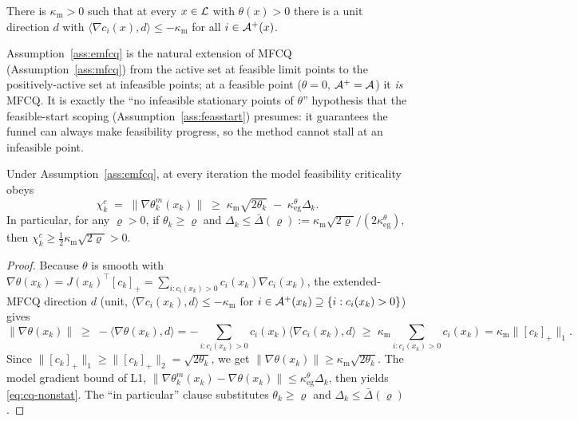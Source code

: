 \begin{assumption}
  \label{ass:emfcq}
  There is $\kappa_{\mathrm m}>0$ such that at every $x\in\mathcal{L}$ with $\theta(x)>0$
  there is a unit direction $d$ with
  $\langle\nabla c_i(x),d\rangle\le-\kappa_{\mathrm m}$ for all $i\in\mathcal{A}^+(x)$.
\end{assumption}

Assumption~\ref{ass:emfcq} is the natural extension of MFCQ
(Assumption~\ref{ass:mfcq}) from the active set at feasible limit points to the
positively-active set at infeasible points; at a feasible point ($\theta=0$,
$\mathcal{A}^+=\mathcal{A}$) it \emph{is} MFCQ. It is exactly the ``no infeasible stationary
points of $\theta$'' hypothesis that the feasible-start scoping
(Assumption~\ref{ass:feasstart}) presumes: it guarantees the funnel can always
make feasibility progress, so the method cannot stall at an infeasible point.

\begin{lemma}
  \label{lem:cq-nonstat}
  Under Assumption~\ref{ass:emfcq}, at every iteration the model feasibility
  criticality obeys
  \begin{equation}
    \label{eq:cq-nonstat}
    \chi_k^c \;=\; \|\nabla\theta_k^m(x_k)\|
             \;\ge\; \kappa_{\mathrm m}\sqrt{2\theta_k}\;-\;\kappa_{\mathrm{eg}}^\theta\Delta_k .
  \end{equation}
  In particular, for any $\varrho>0$, if $\theta_k\ge\varrho$ and
  $\Delta_k\le\bar\Delta(\varrho):=\kappa_{\mathrm m}\sqrt{2\varrho}/(2\kappa_{\mathrm{eg}}^\theta)$,
  then $\chi_k^c\ge\tfrac12\kappa_{\mathrm m}\sqrt{2\varrho}>0$.
\end{lemma}
\begin{proof}
  Because $\theta$ is smooth with $\nabla\theta(x_k)=J(x_k)^\top[c_k]_+=\sum_{i:c_i(x_k)>0}c_i(x_k)\nabla c_i(x_k)$,
  the extended-MFCQ direction $d$ (unit, $\langle\nabla c_i(x_k),d\rangle\le-\kappa_{\mathrm m}$
  for $i\in\mathcal{A}^+(x_k)\supseteq\{i:c_i(x_k)>0\}$) gives
  \[
    \|\nabla\theta(x_k)\| \;\ge\; -\langle\nabla\theta(x_k),d\rangle
      = -\sum_{i:c_i(x_k)>0}c_i(x_k)\langle\nabla c_i(x_k),d\rangle
      \;\ge\; \kappa_{\mathrm m}\!\!\sum_{i:c_i(x_k)>0}\!\!c_i(x_k)
      = \kappa_{\mathrm m}\|[c_k]_+\|_1 .
  \]
  Since $\|[c_k]_+\|_1\ge\|[c_k]_+\|_2=\sqrt{2\theta_k}$, we get
  $\|\nabla\theta(x_k)\|\ge\kappa_{\mathrm m}\sqrt{2\theta_k}$. The model gradient bound
  of L1, $\|\nabla\theta_k^m(x_k)-\nabla\theta(x_k)\|\le\kappa_{\mathrm{eg}}^\theta\Delta_k$,
  then yields \eqref{eq:cq-nonstat}. The ``in particular'' clause substitutes
  $\theta_k\ge\varrho$ and $\Delta_k\le\bar\Delta(\varrho)$.
\end{proof}

